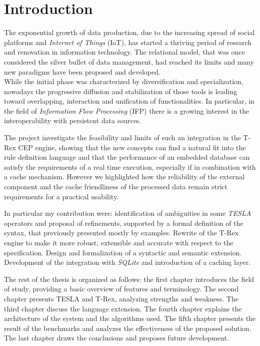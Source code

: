 \chapter*{Introduction}

The exponential growth of data production, due to the increasing spread of social platforms and \emph{Internet of Things} (IoT), has started a thriving period of research and renovation in information technology. The relational model, that was once considered the silver bullet of data management, had reached its limits and many new paradigms have been proposed and developed.\\
While the initial phase was characterized by diversification and specialization, nowadays the progressive diffusion and stabilization of those tools is leading toward overlapping, interaction and unification of functionalities. In particular, in the field of \emph{Information Flow Processing} (IFP) \cite{ifp-survey} there is a growing interest in the interoperability with persistent data sources.

The project investigate the feasibility and limits of such an integration in the T-Rex CEP engine, showing that the new concepts can find a natural fit into the rule definition language and that the performance of an embedded database can satisfy the requirements of a real time execution, especially if in combination with a cache mechanism. However we highlighted how the reliability of the external component and the cache friendliness of the processed data remain strict requirements for a practical usability.

In particular my contribution were: identification of ambiguities in some \emph{TESLA} \cite{tesla} operators and proposal of refinements, supported by a formal definition of the syntax, that previously presented mostly by examples. Rewrite of the T-Rex engine to make it more robust, extensible and accurate with respect to the specification. Design and formalization of a syntactic and semantic extension. Development of the integration with \emph{SQLite} and introduction of a caching layer.

The rest of the thesis is organized as follows: the first chapter introduces the field of study, providing a basic overview of features and terminology. The second chapter presents TESLA and T-Rex, analyzing strengths and weakness. The third chapter discuss the language extension. The fourth chapter explains the architecture of the system and the algorithms used. The fifth chapter presents the result of the benchmarks and analyzes the effectiveness of the proposed solution. The last chapter draws the conclusions and proposes future development.

